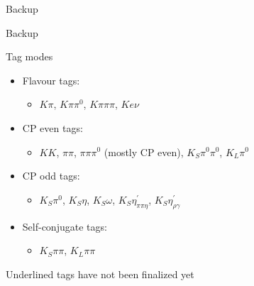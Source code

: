 \documentclass{beamer}
\begin{document}
\begin{frame}{Backup}
  \begin{center}
    {\huge Backup}
  \end{center}
\end{frame}

\begin{frame}{Tag modes}
  \begin{itemize}
    \setlength\itemsep{1.0em}
    \item{Flavour tags:}
    \begin{itemize}
      \item{$K\pi$, $K\pi\pi^0$, $K\pi\pi\pi$, \underline{$Ke\nu$}}
    \end{itemize}
    \item{CP even tags:}
    \begin{itemize}
      \item{$KK$, $\pi\pi$, $\pi\pi\pi^0$ (mostly CP even), $K_S\pi^0\pi^0$, $K_L\pi^0$}
    \end{itemize}
    \item{CP odd tags:}
    \begin{itemize}
      \item{$K_S\pi^0$, $K_S\eta$, $K_S\omega$, $K_S\eta^\prime_{\pi\pi\eta}$, $K_S\eta^\prime_{\rho\gamma}$}
    \end{itemize}
    \item{Self-conjugate tags:}
    \begin{itemize}
      \item{$K_S\pi\pi$, $K_L\pi\pi$}
    \end{itemize}
  \end{itemize}
  Underlined tags have not been finalized yet
\end{frame}
\end{document}

